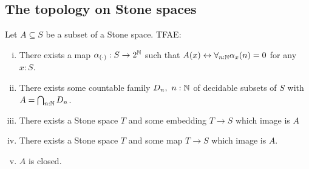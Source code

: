 \subsection{The topology on Stone spaces}
\begin{theorem}\label{StoneClosedSubsets}
  Let $A\subseteq S$ be a subset of a Stone space. TFAE:
  \begin{enumerate}[(i)]
    \item There exists a map $\alpha_{(\cdot)}:S \to 2^{\mathbb{N}}$ such that 
      $A (x) \leftrightarrow \forall_{n:\mathbb{N}} \alpha_x(n) = 0$ for any $x:S$. 
    \item There exists some countable family 
      $D_n,~{n:\mathbb{N}}$ 
      of decidable subsets of $S$ with $A = \bigcap_{n:\mathbb{N}} D_n$. 
    \item There exists a Stone space $T$ and some embedding $T\to S$ which image is $A$
    \item There exists a Stone space $T$ and some map $T\to S$ which image is $A$. 
    \item $A$ is closed.
  \end{enumerate}
\end{theorem}
